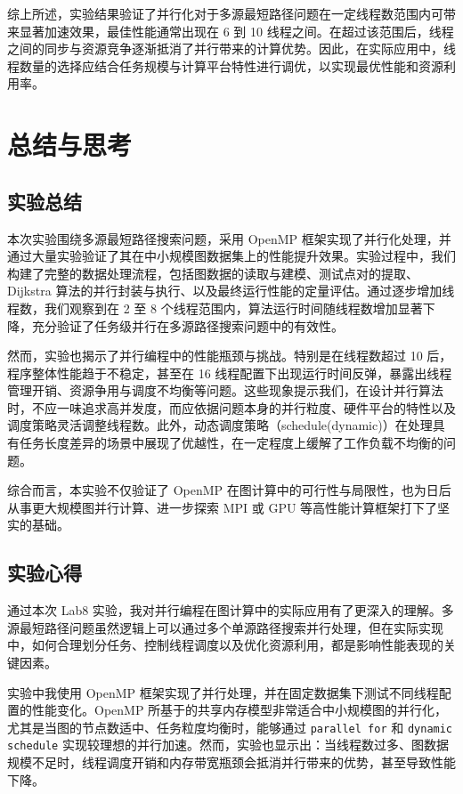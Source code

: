 \documentclass[a4paper, utf8]{ctexart}
\begin{document}
	综上所述，实验结果验证了并行化对于多源最短路径问题在一定线程数范围内可带来显著加速效果，最佳性能通常出现在 6 到 10 线程之间。在超过该范围后，线程之间的同步与资源竞争逐渐抵消了并行带来的计算优势。因此，在实际应用中，线程数量的选择应结合任务规模与计算平台特性进行调优，以实现最优性能和资源利用率。
	
	\section{总结与思考}
	
	\subsection{实验总结}
	
	本次实验围绕多源最短路径搜索问题，采用 OpenMP 框架实现了并行化处理，并通过大量实验验证了其在中小规模图数据集上的性能提升效果。实验过程中，我们构建了完整的数据处理流程，包括图数据的读取与建模、测试点对的提取、Dijkstra 算法的并行封装与执行、以及最终运行性能的定量评估。通过逐步增加线程数，我们观察到在 2 至 8 个线程范围内，算法运行时间随线程数增加显著下降，充分验证了任务级并行在多源路径搜索问题中的有效性。
	
	然而，实验也揭示了并行编程中的性能瓶颈与挑战。特别是在线程数超过 10 后，程序整体性能趋于不稳定，甚至在 16 线程配置下出现运行时间反弹，暴露出线程管理开销、资源争用与调度不均衡等问题。这些现象提示我们，在设计并行算法时，不应一味追求高并发度，而应依据问题本身的并行粒度、硬件平台的特性以及调度策略灵活调整线程数。此外，动态调度策略（schedule(dynamic)）在处理具有任务长度差异的场景中展现了优越性，在一定程度上缓解了工作负载不均衡的问题。
	
	综合而言，本实验不仅验证了 OpenMP 在图计算中的可行性与局限性，也为日后从事更大规模图并行计算、进一步探索 MPI 或 GPU 等高性能计算框架打下了坚实的基础。
	
	\subsection{实验心得}
	
	通过本次 Lab8 实验，我对并行编程在图计算中的实际应用有了更深入的理解。多源最短路径问题虽然逻辑上可以通过多个单源路径搜索并行处理，但在实际实现中，如何合理划分任务、控制线程调度以及优化资源利用，都是影响性能表现的关键因素。
	
	实验中我使用 OpenMP 框架实现了并行处理，并在固定数据集下测试不同线程配置的性能变化。OpenMP 所基于的共享内存模型非常适合中小规模图的并行化，尤其是当图的节点数适中、任务粒度均衡时，能够通过 \verb|parallel for| 和 \verb|dynamic schedule| 实现较理想的并行加速。然而，实验也显示出：当线程数过多、图数据规模不足时，线程调度开销和内存带宽瓶颈会抵消并行带来的优势，甚至导致性能下降。
	
\end{document}
